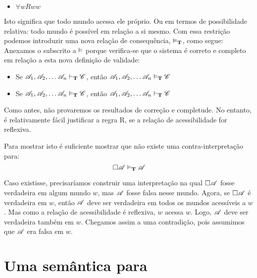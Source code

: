 \begin{itemize}
	\item $\forall wRww$
\end{itemize}
Isto significa que todo mundo acessa ele próprio. Ou em termos de possibilidade relativa: todo mundo é possível em relação a si mesmo. Com   essa restrição podemos introduzir uma nova relação de consequência, $\vDash_{\mathbf{T}}$, como segue:
Anexamos o subscrito \mlT{}  a $\vDash$ porque verifica-se que o sistema \mlT{} é correto e completo em relação a esta nova definição de validade:
\begin{itemize}
	\item Se $\mathscr{A}_1,\mathscr{A}_2, \dots \mathscr{A}_n\vdash_{\mathbf{T}}\mathscr{C}$, então $\mathscr{A}_1,\mathscr{A}_2, \dots \mathscr{A}_n\vDash_{\mathbf{T}}\mathscr{C}$
	\item Se $\mathscr{A}_1,\mathscr{A}_2, \dots \mathscr{A}_n\vDash_{\mathbf{T}}\mathscr{C}$, então $\mathscr{A}_1,\mathscr{A}_2, \dots \mathscr{A}_n\vdash_{\mathbf{T}}\mathscr{C}$
\end{itemize}
Como antes, não provaremos os resultados de correção e completude. No entanto, é relativamente fácil  justificar a regra  R\mlT, se a relação de acessibilidade for 
reflexiva.

Para mostrar isto é suficiente mostrar que não existe uma  contra-interpretação para:
\[
	\Box \mathscr{A}\vDash_{\mathbf{T}} \mathscr{A}
\]
 
Caso existisse,  precisaríamos construir  uma interpretação  na qual $\Box \mathscr{A}$ fosse verdadeira em algum  mundo  $w$, mas $\mathscr{A}$ fosse falsa nesse mundo. Agora, se $\Box \mathscr{A}$ é verdadeira em $w$, então $\mathscr{A}$ deve ser verdadeira em todos os mundos acessíveis a $w$. Mas como a relação de acessibilidade é reflexiva, $w$ acessa $w$. Logo, $\mathscr{A}$ deve ser verdadeira também em $w$. 
Chegamos assim a uma contradição,  pois assumimos que
  $\mathscr{A}$ era falsa em $w$. 

\section{Uma semântica para \mlSfour}
\label{SemanticsS4}

